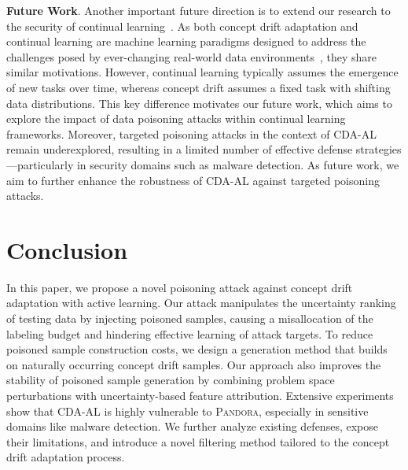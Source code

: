 \documentclass[lettersize,journal]{IEEEtran}
\newcommand{\pandora}{{\scshape Pandora}\xspace}
\begin{document}
\textbf{Future Work}.
Another important future direction is to extend our research to the security of continual learning~\cite{han2023data,guo2024persistent}.
As both concept drift adaptation and continual learning are machine learning paradigms designed to address the challenges posed by ever-changing real-world data environments~\cite{wang2024comprehensive}, they share similar motivations. 
However, continual learning typically assumes the emergence of new tasks over time, whereas concept drift assumes a fixed task with shifting data distributions.
This key difference motivates our future work, which aims to explore the impact of data poisoning attacks within continual learning frameworks.
Moreover, targeted poisoning attacks in the context of CDA-AL remain underexplored, resulting in a limited number of effective defense strategies—particularly in security domains such as malware detection.
As future work, we aim to further enhance the robustness of CDA-AL against targeted poisoning attacks.

\noindent 

\section{Conclusion}
In this paper, we propose a novel poisoning attack against concept drift adaptation with active learning.
Our attack manipulates the uncertainty ranking of testing data by injecting poisoned samples, causing a misallocation of the labeling budget and hindering effective learning of attack targets.
To reduce poisoned sample construction costs, we design a generation method that builds on naturally occurring concept drift samples.
Our approach also improves the stability of poisoned sample generation by combining problem space perturbations with uncertainty-based feature attribution.
Extensive experiments show that CDA-AL is highly vulnerable to \pandora, especially in sensitive domains like malware detection.
We further analyze existing defenses, expose their limitations, and introduce a novel filtering method tailored to the concept drift adaptation process.

\end{document}
